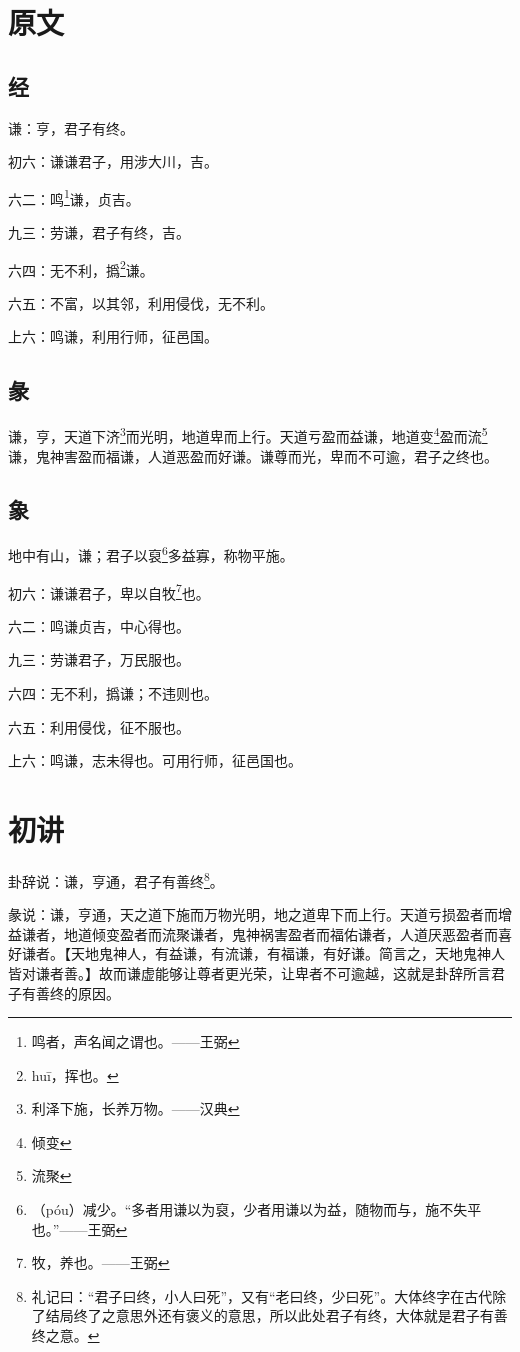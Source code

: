 \documentclass[12pt,oneside]{book}
\begin{document}
\section{原文}

\subsection{经}
谦：亨，君子有终。

初六：谦谦君子，用涉大川，吉。

六二：鸣\footnote{鸣者，声名闻之谓也。——王弼}谦，贞吉。

九三：劳谦，君子有终，吉。

六四：无不利，撝\footnote{huī，挥也。}谦。

六五：不富，以其邻，利用侵伐，无不利。

上六：鸣谦，利用行师，征邑国。

\subsection{彖}
谦，亨，天道下济\footnote{利泽下施，长养万物。——汉典}而光明，地道卑而上行。天道亏盈而益谦，地道变\footnote{倾变}盈而流\footnote{流聚}谦，鬼神害盈而福谦，人道恶盈而好谦。谦尊而光，卑而不可逾，君子之终也。

\subsection{象}
地中有山，谦；君子以裒\footnote{（póu）减少。“多者用谦以为裒，少者用谦以为益，随物而与，施不失平也。”——王弼}多益寡，称物平施。

初六：谦谦君子，卑以自牧\footnote{牧，养也。——王弼}也。

六二：鸣谦贞吉，中心得也。

九三：劳谦君子，万民服也。

六四：无不利，撝谦；不违则也。

六五：利用侵伐，征不服也。

上六：鸣谦，志未得也。可用行师，征邑国也。

\section{初讲}
卦辞说：谦，亨通，君子有善终\footnote{礼记曰：“君子曰终，小人曰死”，又有“老曰终，少曰死”。大体终字在古代除了结局终了之意思外还有褒义的意思，所以此处君子有终，大体就是君子有善终之意。}。

彖说：谦，亨通，天之道下施而万物光明，地之道卑下而上行。天道亏损盈者而增益谦者，地道倾变盈者而流聚谦者，鬼神祸害盈者而福佑谦者，人道厌恶盈者而喜好谦者。【天地鬼神人，有益谦，有流谦，有福谦，有好谦。简言之，天地鬼神人皆对谦者善。】故而谦虚能够让尊者更光荣，让卑者不可逾越，这就是卦辞所言君子有善终的原因。
\end{document}
